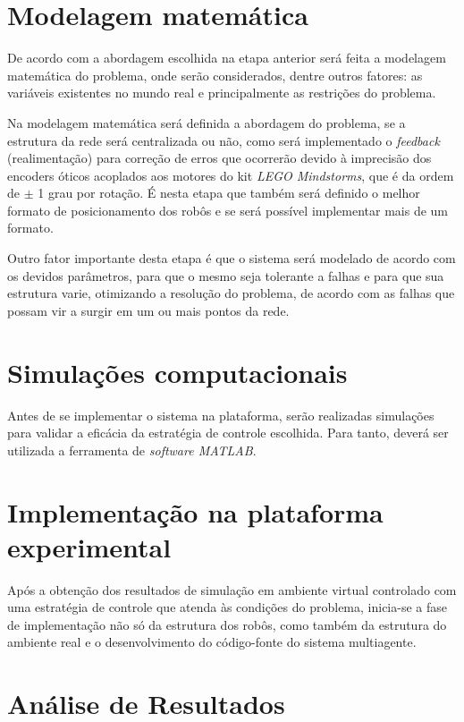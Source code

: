 \section{Modelagem matemática}

De acordo com a abordagem escolhida na etapa anterior será feita a modelagem matemática do problema, onde serão considerados, dentre outros fatores: as variáveis existentes no mundo real e principalmente as restrições do problema. 

Na modelagem matemática será definida a abordagem do problema, se a estrutura da rede será centralizada ou não, como será implementado o \emph{feedback} (realimentação) para correção de erros que ocorrerão devido à imprecisão dos encoders óticos acoplados aos motores do kit \emph{LEGO Mindstorms}, que é da ordem de $\pm$ 1 grau por rotação. %
É nesta etapa que também será definido o melhor formato de posicionamento dos robôs e se será possível implementar mais de um formato. 

Outro fator importante desta etapa é que o sistema será modelado de acordo com os devidos parâmetros, para que o mesmo seja tolerante a falhas e para que sua estrutura varie, otimizando a resolução do problema, de acordo com as falhas que possam vir a surgir em um ou mais pontos da rede.

\section{Simulações computacionais}

Antes de se implementar o sistema na plataforma, serão realizadas simulações para validar a eficácia da estratégia de controle escolhida. Para tanto, deverá ser utilizada a ferramenta de \emph{software MATLAB}.

\section{Implementação na plataforma experimental}

Após a obtenção dos resultados de simulação em ambiente virtual controlado com uma estratégia de controle que atenda às condições do problema, inicia-se a fase de implementação não só da estrutura dos robôs, como também da estrutura do ambiente real e o desenvolvimento do código-fonte do sistema multiagente. 

\section{Análise de Resultados}

